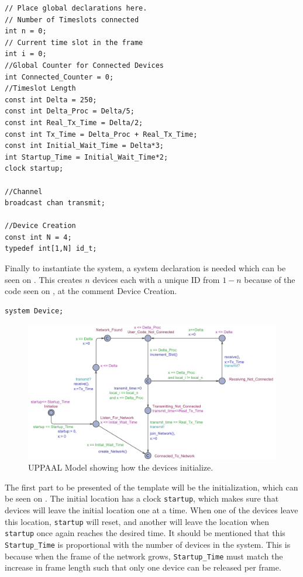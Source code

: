 \begin{lstlisting}[style=UPPAAL,
caption={Code for the global declarations.}, label={uppaal_Global}, multicols=2]
// Place global declarations here.
// Number of Timeslots connected
int n = 0;         
// Current time slot in the frame
int i = 0;            
//Global Counter for Connected Devices                    
int Connected_Counter = 0;
//Timeslot Length
const int Delta = 250;                 
const int Delta_Proc = Delta/5;
const int Real_Tx_Time = Delta/2;
const int Tx_Time = Delta_Proc + Real_Tx_Time;
const int Initial_Wait_Time = Delta*3;
int Startup_Time = Initial_Wait_Time*2;
clock startup;

//Channel
broadcast chan transmit;

//Device Creation
const int N = 4;
typedef int[1,N] id_t;
\end{lstlisting}

Finally to instantiate the system, a system declaration is needed which can be seen on .
This creates $n$ devices each with a unique ID from $1-n$ because of the code seen on , at the comment Device Creation.

\begin{lstlisting}[style=UPPAAL,
caption={Code for system declarations.}, label={UPPAAL_System_Dcl}]
system Device;
\end{lstlisting}

\begin{figure}
  \includegraphics[width=1\textwidth]{Figures/Model/Device_Connecting.pdf} 
\caption{UPPAAL Model showing how the devices initialize.}
\label{fig:UPPAAL_Intitialization}
\end{figure}

\bigskip \noindent
The first part to be presented of the template will be the initialization, which can be seen on .
The initial location has a clock \texttt{startup}, which makes sure that devices will leave the initial location one at a time.
When one of the devices leave this location, \texttt{startup} will reset, and another will leave the location when \texttt{startup} once again reaches the desired time.
It should be mentioned that this \texttt{Startup\_Time} is proportional with the number of devices in the system.
This is because when the frame of the network grows, \texttt{Startup\_Time} must match the increase in frame length such that only one device can be released per frame.

